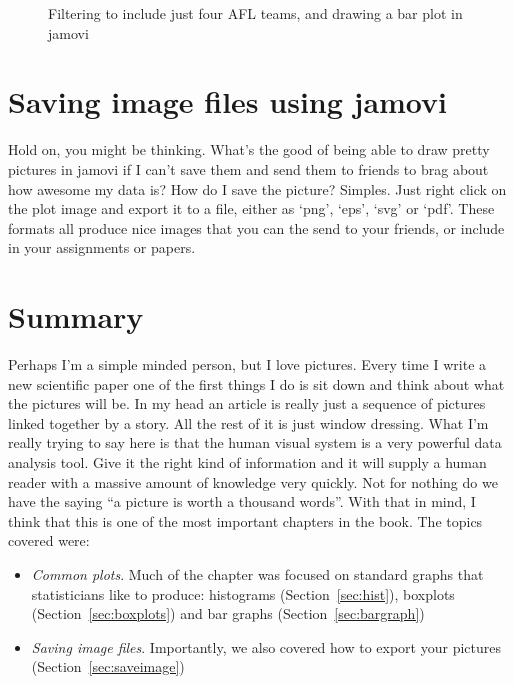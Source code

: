 \vspace{0.5cm}
\begin{figure}[htp]
\begin{center}
\caption{Filtering to include just four AFL teams, and drawing a bar plot in jamovi}
\label{fig:bar1}
\HR
\end{center}
\end{figure}

\section{Saving image files using jamovi~\label{sec:saveimage}}

Hold on, you might be thinking. What's the good of being able to draw pretty pictures in jamovi if I can't save them and send them to friends to brag about how awesome my data is? How do I save the picture? Simples. Just right click on the plot image and export it to a file, either as `png', `eps', `svg' or `pdf'. These formats all produce nice images that you can the send to your friends, or include in your assignments or papers.


\section{Summary}

Perhaps I'm a simple minded person, but I love pictures. Every time I write a new scientific paper one of the first things I do is sit down and think about what the pictures will be. In my head an article is really just a sequence of pictures linked together by a story. All the rest of it is just window dressing. What I'm really trying to say here is that the human visual system is a very powerful data analysis tool. Give it the right kind of information and it will supply a human reader with a massive amount of knowledge very quickly. Not for nothing do we have the saying ``a picture is worth a thousand words''. With that in mind, I think that this is one of the most important chapters in the book. The topics covered were:

\begin{itemize}
\item {\it Common plots}. Much of the chapter was focused on standard graphs that statisticians like to produce: histograms (Section~\ref{sec:hist}), boxplots (Section~\ref{sec:boxplots}) and bar graphs (Section~\ref{sec:bargraph}) 
\item {\it Saving image files}. Importantly, we also covered how to export your pictures (Section~\ref{sec:saveimage})
\end{itemize} 

